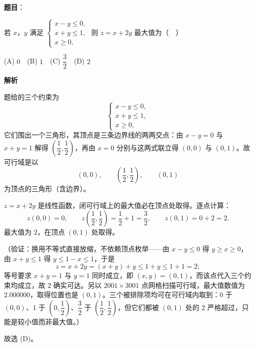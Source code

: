 \begin{answer}

\textbf{题目}：

若 \(x\)，\(y\) 满足 $\begin{cases} x-y\leqslant 0, \\ x+y\leqslant 1, \\ x\geqslant 0, \end{cases}$ 则 \(z=x+2y\) 最大值为（　）

(A) \(0\)　(B) \(1\)　(C) \(\dfrac{3}{2}\)　(D) \(2\)

\textbf{解析}

题给的三个约束为
\nopagebreak[4]
\[
\begin{cases}
x-y\leqslant0,\\
x+y\leqslant1,\\
x\geqslant0,
\end{cases}
\]
它们围出一个三角形，其顶点是三条边界线的两两交点：由 \(x-y=0\) 与 \(x+y=1\) 解得 \(\left(\dfrac{1}{2},\dfrac{1}{2}\right)\)，再由 \(x=0\) 分别与这两式联立得 \((0,0)\) 与 \((0,1)\)。故可行域是以
\nopagebreak[4]
\[
(0,0),\qquad \left(\frac{1}{2},\frac{1}{2}\right),\qquad (0,1)
\]
为顶点的三角形（含边界）。

\(z=x+2y\) 是线性函数，闭可行域上的最大值必在顶点处取得。逐点计算：
\nopagebreak[4]
\[
z(0,0)=0,\qquad z\left(\frac{1}{2},\frac{1}{2}\right)=\frac{1}{2}+1=\frac{3}{2},\qquad z(0,1)=0+2=2.
\]
最大值为 \(2\)，在顶点 \((0,1)\) 处取得。

（验证：换用不等式直接放缩，不依赖顶点枚举——由 \(x-y\leqslant0\) 得 \(y\geqslant x\geqslant0\)，由 \(x+y\leqslant1\) 得 \(y\leqslant1-x\leqslant1\)，于是
\nopagebreak[4]
\[
z=x+2y=(x+y)+y\leqslant1+y\leqslant1+1=2;
\]
等号要求 \(x+y=1\) 与 \(y=1\) 同时成立，即 \((x,y)=(0,1)\)，而该点代入三个约束均成立，故 \(2\) 确实可达。另以 \(2001\times3001\) 点网格扫描可行域，最大值数值为 \(2.000000\)，取得位置也是 \((0,1)\)。三个被排除项均可在可行域内取到：\(0\) 于 \((0,0)\)、\(1\) 于 \(\left(0,\dfrac{1}{2}\right)\)、\(\dfrac{3}{2}\) 于 \(\left(\dfrac{1}{2},\dfrac{1}{2}\right)\)，但它们都被 \((0,1)\) 处的 \(2\) 严格超过，只能是较小值而非最大值。）

故选 (D)。


\end{answer}

